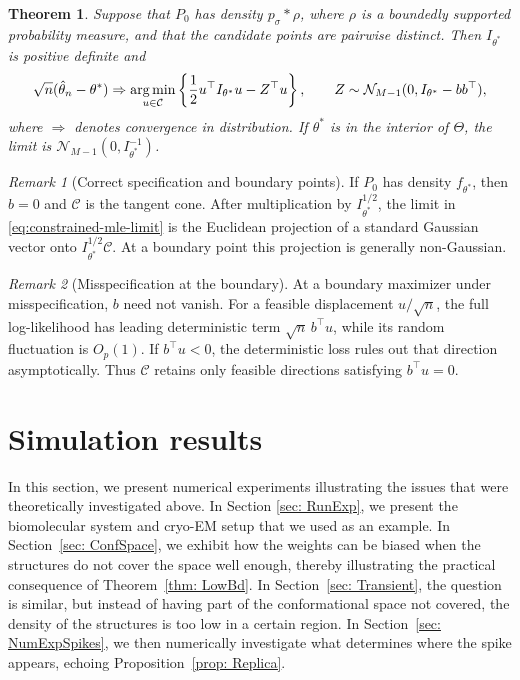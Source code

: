 \documentclass[12pt]{iopart}
\providecommand{\argmin}{\operatornamewithlimits{\arg\min}}
\newtheorem{thm}{Theorem}
\theoremstyle{remark}
\newtheorem{rmk}{Remark}
\begin{document}
\begin{thm}
\label{thm: CLT}
Suppose that $P_0$ has density $p_\sigma*\rho$, where $\rho$ is a
boundedly supported probability measure, and that the candidate points are
pairwise distinct. Then $I_{\theta^*}$ is positive definite and
\begin{equation}
\label{eq:constrained-mle-limit}
\sqrt n(\hat\theta_n-\theta^*)
\Rightarrow
\argmin_{u\in\mathcal C}
\left\{\frac12u^\top I_{\theta^*}u-Z^\top u\right\},
\qquad
Z\sim\mathcal N_{M-1}(0,I_{\theta^*}-bb^\top),
\end{equation}
where $\Rightarrow$ denotes convergence in distribution.
If $\theta^*$ is in the interior of $\Theta$, the limit is
$\mathcal N_{M-1}(0,I_{\theta^*}^{-1})$.
\end{thm}

\begin{rmk}[Correct specification and boundary points]
If $P_0$ has density $f_{\theta^*}$, then $b=0$ and $\mathcal C$ is the
tangent cone. After multiplication by $I_{\theta^*}^{1/2}$, the limit in
\eqref{eq:constrained-mle-limit} is the Euclidean projection of a standard
Gaussian vector onto $I_{\theta^*}^{1/2}\mathcal C$. At a boundary point
this projection is generally non-Gaussian.
\end{rmk}

\begin{rmk}[Misspecification at the boundary]
At a boundary maximizer under misspecification, $b$ need not vanish. For a
feasible displacement $u/\sqrt n$, the full log-likelihood has leading
deterministic term $\sqrt n\,b^\top u$, while its random fluctuation is
$O_p(1)$. If $b^\top u<0$, the deterministic loss rules out that direction
asymptotically. Thus $\mathcal C$ retains only feasible directions satisfying
$b^\top u=0$.
\end{rmk}



\section{Simulation results}
\label{sec: sim}

In this section, we present numerical experiments illustrating the issues that were theoretically investigated above. In Section \ref{sec: RunExp}, we present the biomolecular system and cryo-EM setup that we used as an example. 
In Section~\ref{sec: ConfSpace}, we exhibit how the weights can be biased when the structures do not cover the space well enough, thereby illustrating the practical consequence of Theorem~\ref{thm: LowBd}.
In Section~\ref{sec: Transient}, the question is similar, but instead of having part of the conformational space not covered, the density of the structures is too low in a certain region. In Section~\ref{sec: NumExpSpikes}, we then numerically investigate what determines where the spike appears, echoing Proposition~\ref{prop: Replica}.
\end{document}
